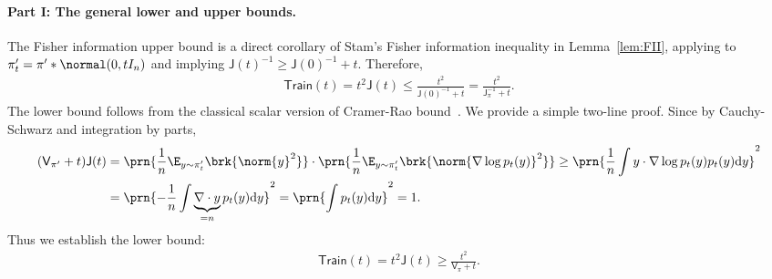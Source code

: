 \documentclass[11pt]{article}
\newcommand{\de}{\mathrm{d}}
\newcommand{\tfunc}{\mathsf{Train}}
\newcommand{\jfunc}{\mathsf{J}}
\begin{document}
\paragraph{Part I: The general lower and upper bounds.} 
The Fisher information upper bound is a direct corollary of Stam's Fisher information inequality in Lemma~\ref{lem:FII}, applying to $\pi'_t = \pi' * \normal(0, t I_n)$ and implying $\jfunc(t)^{-1} \geq \jfunc(0)^{-1} +t$. Therefore,
\begin{align*}
    \tfunc(t) = t^2 \jfunc(t) \leq \frac{t^2}{\jfunc(0)^{-1} +t} = \frac{t^2}{\jfunc_{\pi}^{-1} +t}.
\end{align*}
The lower bound follows from the classical scalar version of Cramer-Rao bound~\cite[Chp.~2]{lehmann1998theory}. We provide a simple two-line proof. Since by Cauchy-Schwarz and integration by parts,
\begin{align*}
    (\mathsf{V}_{\pi'} + t) \jfunc(t) & = \prn{\frac{1}{n}\E_{y \sim \pi_t'} \brk{\norm{y}^2}} \cdot \prn{\frac{1}{n} \E_{y \sim \pi_t'} \brk{\norm{\nabla \log p_t(y)}^2}} \geq \prn{\frac{1}{n}\int y \cdot \nabla \log p_t(y) p_t(y) \de y }^2 \nonumber \\
    & = \prn{-\frac{1}{n}\int \underbrace{\nabla \cdot y}_{=n} p_t(y) \de y }^2 = \prn{\int  p_t(y) \de y }^2 = 1.
\end{align*}
Thus we establish the lower bound:
\begin{align*}
    \tfunc(t) = t^2 \jfunc(t) \geq \frac{t^2}{\mathsf{V}_{\pi} + t}.
\end{align*}
\end{document}
